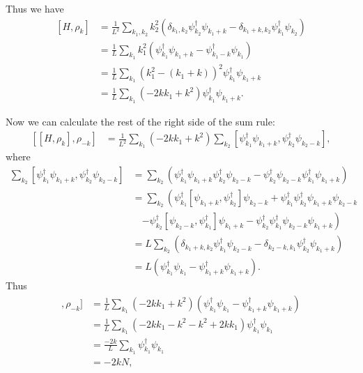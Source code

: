 \documentclass[11pt, a4paper]{report} %
\begin{document}
Thus we have
\begin{align}
  \label{eq:13}
  [H, \rho_k] &= \frac{1}{L^2} \sum_{k_1,k_2} k_2^2  \left( \delta_{k_1,k_2} \psi_{k_2}^{\dag}\psi_{k_1+k} -  \delta_{k_1+k,k_2}\psi_{k_1}^{\dag}\psi_{k_2} \right) \\
              &= \frac{1}{L} \sum_{k_1} k_1^2  \left(\psi_{k_1}^{\dag}\psi_{k_1+k} -  \psi_{k_1-k}^{\dag}\psi_{k_1} \right) \\
              &= \frac{1}{L} \sum_{k_1} (k_1^2 -(k_1+k))^2 \psi_{k_1}^{\dag}\psi_{k_1+k}\\
              &= \frac{1}{L} \sum_{k_1} (-2kk_1+k^2) \psi_{k_1}^{\dag}\psi_{k_1+k}.
\end{align}

Now we can calculate the rest of the right side of the sum rule:
\begin{align}
  \label{eq:14}
  [[H,\rho_k],\rho_{-k}] &= \frac{1}{L^2} \sum_{k_1}(-2kk_1+k^2) \sum_{k_2} [\psi_{k_1}^{\dag}\psi_{k_1+k}, \psi_{k_2}^{\dag}\psi_{k_2-k}],
\end{align}
where
\begin{align}
  \label{eq:15}
   \sum_{k_2} [\psi_{k_1}^{\dag}\psi_{k_1+k}, \psi_{k_2}^{\dag}\psi_{k_2-k}] &=  \sum_{k_2} \left(\psi_{k_1}^{\dag}\psi_{k_1+k} \psi_{k_2}^{\dag}\psi_{k_2-k} - \psi_{k_2}^{\dag}\psi_{k_2-k}\psi_{k_1}^{\dag}\psi_{k_1+k} \right)\\
                                                                             &= \sum_{k_2} \left(\psi_{k_1}^{\dag}[\psi_{k_1+k}, \psi_{k_2}^{\dag}]\psi_{k_2-k} + \psi_{k_1}^{\dag} \psi_{k_2}^{\dag}\psi_{k_1+k}\psi_{k_2-k} \right.\nonumber\\
&\quad\left. - \psi_{k_2}^{\dag}[\psi_{k_2-k},\psi_{k_1}^{\dag}]\psi_{k_1+k} -\psi_{k_2}^{\dag}\psi_{k_1}^{\dag}\psi_{k_2-k}\psi_{k_1+k} \right) \\
                                                                             &= L\sum_{k_2} \left(\delta_{k_1+k,k_2}\psi_{k_1}^{\dag}\psi_{k_2-k} - \delta_{k_2-k,k_1}\psi_{k_2}^{\dag}\psi_{k_1+k}\right) \\
                                                                             &= L \left(\psi_{k_1}^{\dag}\psi_{k_1} - \psi_{k_1+k}^{\dag}\psi_{k_1+k}\right) .
\end{align}
Thus
\begin{align}
  [[H,\rho_k],\rho_{-k}] &= \frac{1}{L} \sum_{k_1}(-2kk_1+k^2) \left(\psi_{k_1}^{\dag}\psi_{k_1} - \psi_{k_1+k}^{\dag}\psi_{k_1+k}\right) \\
                         &=  \frac{1}{L} \sum_{k_1}(-2kk_1-k^2 -k^2+2kk_1) \psi_{k_1}^{\dag}\psi_{k_1}\\
                         &=  \frac{-2k}{L} \sum_{k_1}\psi_{k_1}^{\dag}\psi_{k_1}\\
                         &= -2kN,
\end{align}
\end{document}
